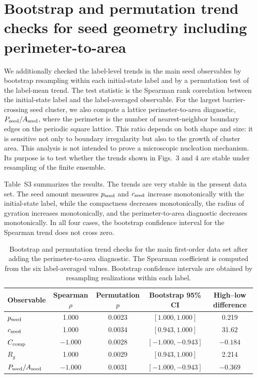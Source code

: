 ﻿\documentclass[aps,pre,preprint,floatfix,amsmath,amssymb,superscriptaddress]{revtex4-2}
\begin{document}
\clearpage

\section*{Bootstrap and permutation trend checks for seed geometry including perimeter-to-area}

We additionally checked the label-level trends in the main seed observables by bootstrap resampling within each initial-state label and by a permutation test of the label-mean trend. The test statistic is the Spearman rank correlation between the initial-state label and the label-averaged observable. For the largest barrier-crossing seed cluster, we also compute a lattice perimeter-to-area diagnostic, $P_{\rm seed}/A_{\rm seed}$, where the perimeter is the number of nearest-neighbor boundary edges on the periodic square lattice. This ratio depends on both shape and size: it is sensitive not only to boundary irregularity but also to the growth of cluster area. This analysis is not intended to prove a microscopic nucleation mechanism. Its purpose is to test whether the trends shown in Figs.~3 and 4 are stable under resampling of the finite ensemble.

Table~S3 summarizes the results. The trends are very stable in the present data set. The seed amount measures $p_{\rm seed}$ and $c_{\rm seed}$ increase monotonically with the initial-state label, while the compactness decreases monotonically, the radius of gyration increases monotonically, and the perimeter-to-area diagnostic decreases monotonically. In all four cases, the bootstrap confidence interval for the Spearman trend does not cross zero.

\begin{table}[t]
\centering
\caption{Bootstrap and permutation trend checks for the main first-order data set after adding the perimeter-to-area diagnostic. The Spearman coefficient is computed from the six label-averaged values. Bootstrap confidence intervals are obtained by resampling realizations within each label.}
\label{tab:S3-bootstrap-trend}
\begin{tabular}{lcccc}
\hline
Observable & Spearman $\rho$ & Permutation $p$ & Bootstrap 95\% CI & High--low difference \\
\hline
$p_{\rm seed}$ & 1.000 & 0.0023 & $[1.000,1.000]$ & 0.219 \\
$c_{\rm seed}$ & 1.000 & 0.0034 & $[0.943,1.000]$ & 31.62 \\
$C_{\rm comp}$ & $-1.000$ & 0.0028 & $[-1.000,-0.943]$ & $-0.184$ \\
$R_g$ & 1.000 & 0.0029 & $[0.943,1.000]$ & 2.214 \\
$P_{\rm seed}/A_{\rm seed}$ & $-1.000$ & 0.0031 & $[-1.000,-0.943]$ & $-0.369$ \\
\hline
\end{tabular}
\end{table}
\end{document}
